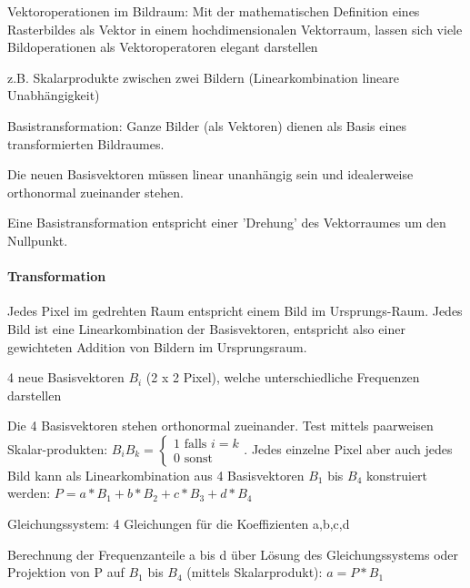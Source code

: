 \documentclass[landscape]{article}
\begin{document}
\begin{multicols}{3}
  
  Vektoroperationen im Bildraum: Mit der mathematischen Definition eines Rasterbildes als Vektor in einem hochdimensionalen Vektorraum, lassen sich viele Bildoperationen als Vektoroperatoren elegant darstellen
  \begin{itemize*}
    \item z.B. Skalarprodukte zwischen zwei Bildern (Linearkombination lineare Unabhängigkeit)
    \item Basistransformation: Ganze Bilder (als Vektoren) dienen als Basis eines transformierten Bildraumes.
    \item Die neuen Basisvektoren müssen linear unanhängig sein und idealerweise orthonormal zueinander stehen.
    \item Eine Basistransformation entspricht einer 'Drehung' des Vektorraumes um den Nullpunkt.
  \end{itemize*}
  
  \paragraph{Transformation}
  Jedes Pixel im gedrehten Raum entspricht einem Bild im Ursprungs-Raum.
  Jedes Bild ist eine Linearkombination der Basisvektoren, entspricht also einer gewichteten Addition von Bildern im Ursprungsraum.
  
  
  4 neue Basisvektoren $B_i$ (2 x 2 Pixel), welche unterschiedliche Frequenzen darstellen
  
  
  Die 4 Basisvektoren stehen orthonormal zueinander. Test mittels paarweisen Skalar-produkten: $B_iB_k=\begin{cases}1 \text{ falls } i=k\\ 0 \text{ sonst }\end{cases}$.
  Jedes einzelne Pixel aber auch jedes Bild kann als Linearkombination aus 4 Basisvektoren $B_1$ bis $B_4$ konstruiert werden: $P=a*B_1+b*B_2+c*B_3+d*B_4$
  \begin{itemize*}
    \item Gleichungssystem: 4 Gleichungen für die Koeffizienten a,b,c,d
    \item Berechnung der Frequenzanteile a bis d über Lösung des Gleichungssystems oder Projektion von P auf $B_1$ bis $B_4$ (mittels Skalarprodukt): $a=P*B_1$
  \end{itemize*}
  

\end{multicols}
\end{document}
